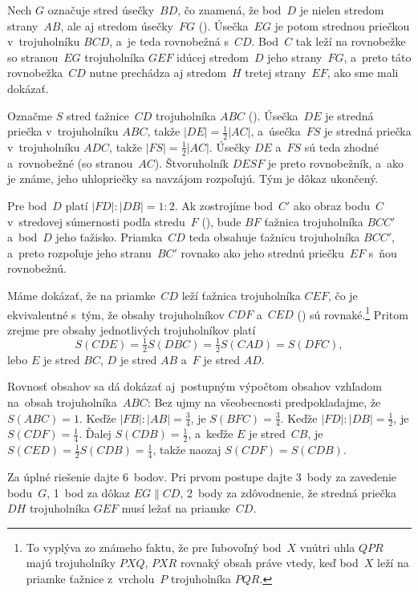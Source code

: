 {%
Nech $G$ označuje stred úsečky~$BD$, čo znamená, že bod~$D$ je nielen stredom
strany~$AB$, ale aj stredom úsečky~$FG$ (\obr). Úsečka~$EG$ je potom strednou
priečkou v~trojuholníku $BCD$, a~je teda rovnobežná s~$CD$.
Bod~$C$ tak leží na rovnobežke so stranou~$EG$ trojuholníka $GEF$ idúcej stredom~$D$
jeho strany~$FG$, a~preto táto rovnobežka~$CD$ nutne prechádza aj stredom~$H$
tretej strany~$EF$, ako sme mali dokázať.
%

\ineres
Označme $S$ stred ťažnice~$CD$ trojuholníka $ABC$ (\obr).
Úsečka~$DE$ je stredná priečka v~trojuholníku $ABC$, takže $|DE|=\frac12|AC|$,
a~úsečka~$FS$ je stredná priečka v~trojuholníku $ADC$, takže $|FS|=\frac12|AC|$.
Úsečky $DE$ a~$FS$ sú teda zhodné a~rovnobežné
(so stranou~$AC$). Štvoruholník $DESF$ je preto rovnobežník, a~ako je známe,
jeho uhlopriečky sa navzájom rozpoľujú. Tým je dôkaz ukončený.
%

\ineres
Pre bod~$D$ platí $|FD|:|DB| = 1:2$.
Ak zostrojíme bod~$C'$ ako obraz bodu~$C$ v~stredovej súmernosti
podľa stredu~$F$ (\obr), bude $BF$ ťažnica trojuholníka $BCC'$ a~bod~$D$
jeho ťažisko. Priamka~$CD$ teda obsahuje ťažnicu trojuholníka $BCC'$, a~preto rozpoľuje
jeho stranu~$BC'$ rovnako ako jeho strednú priečku~$EF$ s~ňou rovnobežnú.

\ineres
Máme dokázať, že na priamke~$CD$ leží ťažnica trojuholníka $CEF$, čo je ekvivalentné s~tým,
že obsahy trojuholníkov $CDF$ a~$CED$ ()
sú rovnaké.\footnote{To vyplýva zo známeho faktu, že pre ľubovoľný bod~$X$ vnútri
uhla $QPR$ majú trojuholníky $PXQ$, $PXR$ rovnaký obsah práve vtedy, keď bod~$X$ leží na priamke
ťažnice z~vrcholu~$P$ trojuholníka $PQR$.}
Pritom zrejme pre obsahy jednotlivých trojuholníkov platí
$$
S(CDE) = \tfrac12 S(DBC) = \tfrac12 S(CAD)= S(DFC),
$$
lebo $E$ je stred $BC$, $D$ je stred $AB$ a~$F$ je stred $AD$.

\poznamka
Rovnosť obsahov sa dá dokázať aj~postupným výpočtom obsahov vzhľadom
na~obsah trojuholníka~$ABC$: Bez ujmy na všeobecnosti predpokladajme, že ${S(ABC) =1}$.
Keďže $|FB|:|AB| = \frac34$, je $S(BFC) = \frac34$.
Keďže ${|FD|:|DB| = \frac12}$, je $S(CDF) = \frac14$. Ďalej $S(CDB) = \frac12$,
a~keďže $E$ je stred~$CB$,
je $S(CED) = {\frac12 S(CDB) = \frac14}$, takže naozaj $S(CDF) = S(CDB)$.

\nobreak\medskip\petit\noindent
Za úplné riešenie dajte 6~bodov.
Pri prvom postupe dajte 3~body za zavedenie bodu~$G$,
1~bod za dôkaz $EG\parallel CD$,
2~body za zdôvodnenie, že stredná priečka~$DH$ trojuholníka $GEF$ musí ležať na priamke~$CD$.

}
